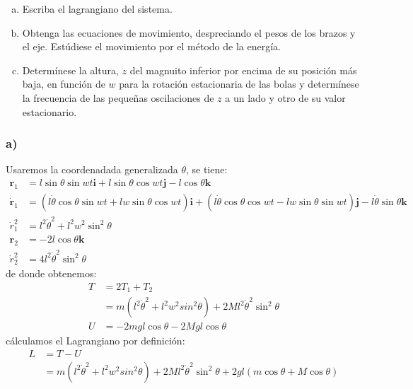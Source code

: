 \documentclass{article}
\begin{document}
\begin{enumerate}[a)]
    \item Escriba el lagrangiano del sistema.
    \item Obtenga las ecuaciones de movimiento, despreciando el pesos de los brazos y el eje. Estúdiese el movimiento por el método de la energía.
    \item Determínese la altura, $z$ del magnuito inferior por encima de su posición más baja, en función de $w$ para la rotación estacionaria de las bolas 
    y determínese la frecuencia de las pequeñas oscilaciones de $z$ a un lado y otro de su valor estacionario.
\end{enumerate}
\begin{tcolorbox}[breakable]
    \subsubsection*{a)}
    Usaremos la coordenadada generalizada $\theta$, se tiene:
    \begin{align*}
        \bm{r}_1 &= l \sin\theta \sin wt\bm{i} + l\sin\theta \cos wt \bm{j} - l\cos\theta \bm{k}\\
        \bm{\dot{r}}_1 
        &=(l\dot{\theta} \cos\theta \sin wt + lw \sin\theta \cos wt) \bm{i} 
        + (l\dot{\theta} \cos\theta \cos wt - lw\sin\theta \sin wt)\bm{j}
        - l\dot{\theta} \sin\theta \bm{k} \\
        \dot{r}_1^2 
        &= l^2\dot{\theta}^2 + l^2w^2\sin^2\theta \\ 
        \bm{r}_2 &= -2l \cos \theta \bm{k} \\
        \dot{r}_2^2 &= 4l^2\dot{\theta}^2\sin^2\theta
    \end{align*}
    de donde obtenemos:
    \begin{align*}
        T 
        &= 2T_1 + T_2 \\
        &= m(l^2\dot{\theta}^2+l^2w^2sin^2\theta) + 2Ml^2\dot{\theta}^2 \sin^2\theta \\
        U
        &= -2mgl\cos\theta - 2Mgl\cos\theta
    \end{align*}
    cálculamos el Lagrangiano por definición:
    \begin{align*}
        L 
        &= T-U \\
        &= m(l^2\dot{\theta}^2+l^2w^2sin^2\theta) + 2Ml^2\dot{\theta}^2 \sin^2\theta + 2gl(m\cos\theta + M\cos\theta)
    \end{align*}

\end{tcolorbox}
\end{document}
